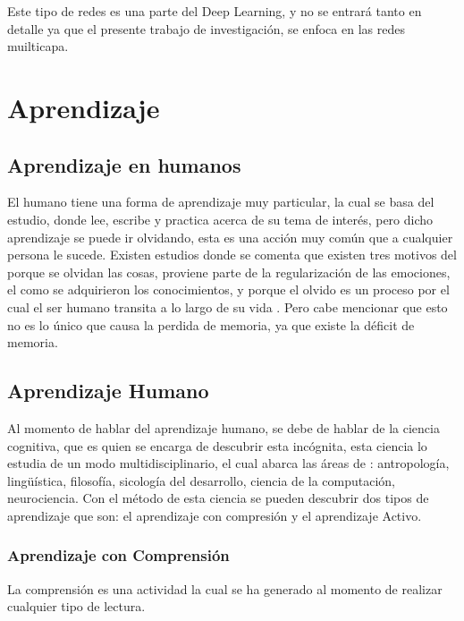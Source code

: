             Este tipo de redes es una parte del Deep Learning, y no se entrará tanto en detalle ya que el presente trabajo de investigación, se enfoca en las redes muilticapa.
  

\section{Aprendizaje}

    \subsection{Aprendizaje en humanos}
    	
    	
        El humano tiene una forma de aprendizaje muy particular, la cual se basa del estudio, donde lee, escribe y practica acerca de
        su tema de interés, pero dicho aprendizaje se puede ir olvidando, esta es una acción muy común que a cualquier persona le sucede.
        Existen estudios donde se comenta que existen tres motivos del porque se olvidan las cosas, proviene parte de la regularización de las emociones,
        el como se adquirieron los conocimientos, y porque el olvido es un proceso por el cual el ser humano transita a lo largo de su vida \cite{Nrby2015}. Pero cabe
        mencionar que esto no es lo único que causa la perdida de memoria, ya que existe la déficit de memoria. 

    \subsection{Aprendizaje Humano}
    	
    	
        Al momento de hablar del aprendizaje humano, se debe de hablar de la ciencia cognitiva, que es quien se encarga de descubrir esta incógnita,
        esta ciencia lo estudia de un modo multidisciplinario, el cual abarca las \'areas de \cite{bransford2000}: antropología, lingüística, 
        filosofía, sicología del desarrollo, ciencia de la computación, neurociencia.
        Con el método de esta ciencia se pueden descubrir dos tipos de aprendizaje que son: el aprendizaje con compresi\'on y el aprendizaje Activo.
        
        \subsubsection{Aprendizaje con Comprensi\'on}
        	
        	
            La comprensi\'on es una actividad la cual se ha generado al momento de realizar cualquier tipo de lectura.\\
            
